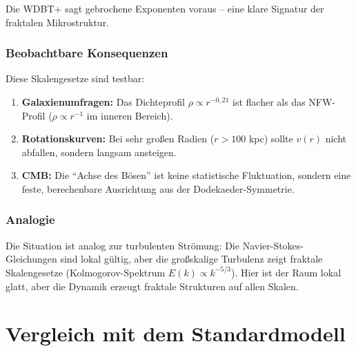 \documentclass[12pt,a4paper]{article}
\begin{document}
Die WDBT+ sagt gebrochene Exponenten voraus -- eine klare Signatur der fraktalen Mikrostruktur.

\subsubsection{Beobachtbare Konsequenzen}

Diese Skalengesetze sind testbar:
\begin{enumerate}
\item \textbf{Galaxienumfragen:} Das Dichteprofil $\rho \propto r^{-0,21}$ ist flacher als das NFW-Profil ($\rho \propto r^{-1}$ im inneren Bereich).
\item \textbf{Rotationskurven:} Bei sehr großen Radien ($r > 100$ kpc) sollte $v(r)$ nicht abfallen, sondern langsam ansteigen.
\item \textbf{CMB:} Die \enquote{Achse des Bösen} ist keine statistische Fluktuation, sondern eine feste, berechenbare Ausrichtung aus der Dodekaeder-Symmetrie.
\end{enumerate}

\subsubsection{Analogie}

Die Situation ist analog zur turbulenten Strömung: Die Navier-Stokes-Gleichungen sind lokal gültig, aber die großskalige Turbulenz zeigt fraktale Skalengesetze (Kolmogorov-Spektrum $E(k) \propto k^{-5/3}$). Hier ist der Raum lokal glatt, aber die Dynamik erzeugt fraktale Strukturen auf allen Skalen.

\section{Vergleich mit dem Standardmodell}
\end{document}
